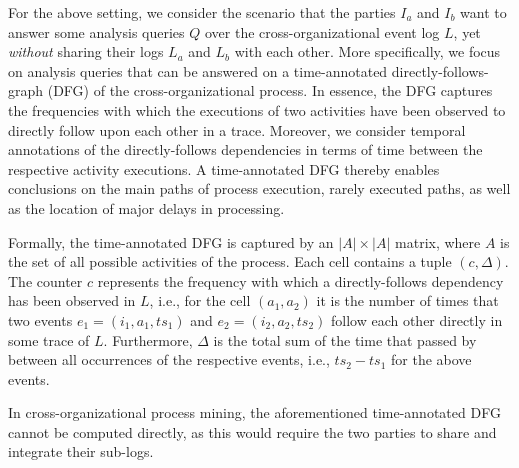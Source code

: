 For the above setting, we consider the scenario that the parties $I_a$ and 
$I_b$ want to answer some analysis queries $Q$ over the cross-organizational 
event log $L$, yet \emph{without} sharing their logs $L_a$ and $L_b$ with each 
other. 
More specifically, we focus on analysis queries that can be answered on a 
time-annotated directly-follows-graph (DFG) of the cross-organizational 
process.  In essence, the DFG captures the frequencies with which the executions 
of two activities have been observed to directly follow upon each other in a 
trace. Moreover, we consider temporal annotations of the directly-follows 
dependencies in terms of time between the respective activity executions. A 
time-annotated DFG thereby enables conclusions on the main paths of process 
execution, rarely executed paths, as well as the location of major delays in 
processing.

Formally, the time-annotated DFG is captured by an $|A| \times |A|$ matrix, 
where $A$ is the set of all possible activities of the process. Each cell 
contains a tuple $(c,\Delta)$. The counter $c$ represents the frequency with 
which a directly-follows dependency has been observed in $L$, i.e., for the 
cell $(a_1,a_2)$ it is the number of times that two events $e_1=(i_1,a_1,ts_1)$ 
and $e_2=(i_2,a_2,ts_2)$ follow each other directly in some trace of $L$. 
Furthermore, 
$\Delta$ is the total sum of the time that passed by between all occurrences of 
the respective events, i.e., $ts_2 - ts_1$ for the above events. 

In cross-organizational process mining, the aforementioned time-annotated DFG 
cannot be computed directly, as this would require the two parties to share and 
integrate their sub-logs. 


